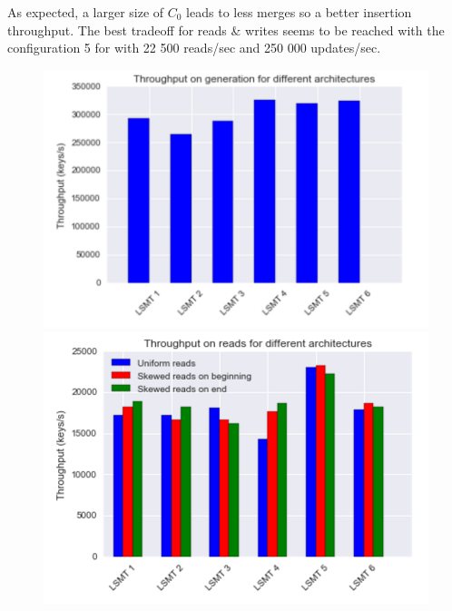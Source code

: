 \documentclass{sig-alternate-05-2015}
\begin{document}
As expected, a larger size of $C_0$ leads to less merges so a better insertion throughput. The best tradeoff for reads \& writes seems to be reached with the configuration 5 for with 22 500 reads/sec and 250 000 updates/sec.

\begin{figure}

  \begin{minipage}[b]{0.3\textwidth}
    \includegraphics[width=\textwidth]{archi_generation}
  \end{minipage}
  \hfill
  \begin{minipage}[b]{0.3\textwidth}
    \includegraphics[width=\textwidth]{archi_reads}
  \end{minipage}
  \hfill
  \begin{minipage}[b]{0.3\textwidth}

\end{minipage}
\end{figure}
\end{document}
